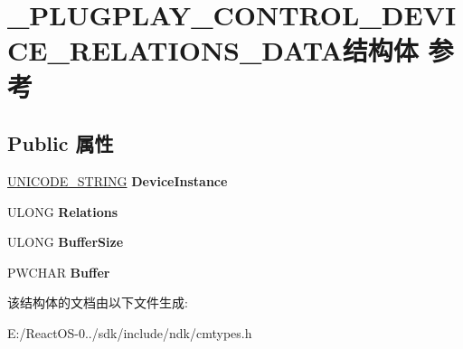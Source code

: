\hypertarget{struct___p_l_u_g_p_l_a_y___c_o_n_t_r_o_l___d_e_v_i_c_e___r_e_l_a_t_i_o_n_s___d_a_t_a}{}\section{\+\_\+\+P\+L\+U\+G\+P\+L\+A\+Y\+\_\+\+C\+O\+N\+T\+R\+O\+L\+\_\+\+D\+E\+V\+I\+C\+E\+\_\+\+R\+E\+L\+A\+T\+I\+O\+N\+S\+\_\+\+D\+A\+T\+A结构体 参考}
\label{struct___p_l_u_g_p_l_a_y___c_o_n_t_r_o_l___d_e_v_i_c_e___r_e_l_a_t_i_o_n_s___d_a_t_a}
\subsection*{Public 属性}
\begin{DoxyCompactItemize}
\item 
\mbox{\label{struct___p_l_u_g_p_l_a_y___c_o_n_t_r_o_l___d_e_v_i_c_e___r_e_l_a_t_i_o_n_s___d_a_t_a_a60ffe9a12dd597ee5541cdb989b9018c}} 
\hyperlink{struct___u_n_i_c_o_d_e___s_t_r_i_n_g}{U\+N\+I\+C\+O\+D\+E\+\_\+\+S\+T\+R\+I\+NG} {\bfseries Device\+Instance}
\item 
\mbox{\label{struct___p_l_u_g_p_l_a_y___c_o_n_t_r_o_l___d_e_v_i_c_e___r_e_l_a_t_i_o_n_s___d_a_t_a_a678aa633a620c52d5e8732e58286d1d9}} 
U\+L\+O\+NG {\bfseries Relations}
\item 
\mbox{\label{struct___p_l_u_g_p_l_a_y___c_o_n_t_r_o_l___d_e_v_i_c_e___r_e_l_a_t_i_o_n_s___d_a_t_a_a3f595aa5ab658c62b27589385baedf22}} 
U\+L\+O\+NG {\bfseries Buffer\+Size}
\item 
\mbox{\label{struct___p_l_u_g_p_l_a_y___c_o_n_t_r_o_l___d_e_v_i_c_e___r_e_l_a_t_i_o_n_s___d_a_t_a_a56055596d56f52dc5d996203a5abf3b7}} 
P\+W\+C\+H\+AR {\bfseries Buffer}
\end{DoxyCompactItemize}


该结构体的文档由以下文件生成\+:\begin{DoxyCompactItemize}
\item 
E\+:/\+React\+O\+S-\/0../sdk/include/ndk/cmtypes.\+h\end{DoxyCompactItemize}
